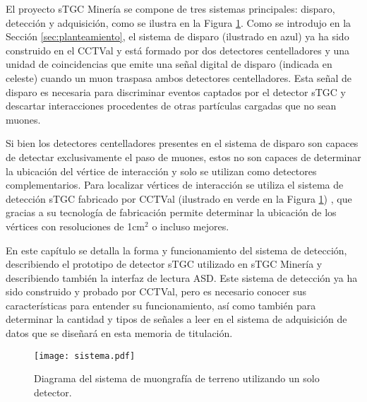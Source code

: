 El proyecto sTGC Minería se compone de tres sistemas principales: disparo, detección y adquisición, como se ilustra en la Figura \ref{fig:sistema-completo}. Como se introdujo en la Sección \ref{sec:planteamiento}, el sistema de disparo \cite{Oyanadel2020SistemaSTGC} (ilustrado en azul) ya ha sido construido en el CCTVal y está formado por dos detectores centelladores y una unidad de coincidencias que emite una señal digital de disparo (indicada en celeste) cuando un muon traspasa ambos detectores centelladores. Esta señal de disparo es necesaria para discriminar eventos captados por el detector sTGC y descartar interacciones procedentes de otras partículas cargadas que no sean muones. %
	
Si bien los detectores centelladores presentes en el sistema de disparo son capaces de detectar exclusivamente el paso de muones, estos no son capaces de determinar la ubicación del vértice de interacción y solo se utilizan como detectores complementarios. Para localizar vértices de interacción se utiliza el sistema de detección sTGC fabricado por CCTVal (ilustrado en verde en la Figura \ref{fig:sistema-completo}) , que gracias a su tecnología de fabricación permite determinar la ubicación de los vértices con resoluciones de 1cm$^2$ o incluso mejores.
	
En este capítulo se detalla la forma y funcionamiento del sistema de detección, describiendo el prototipo de detector sTGC utilizado en sTGC Minería y describiendo también la interfaz de lectura ASD. Este sistema de detección ya ha sido construido y probado por CCTVal, pero es necesario conocer sus características para entender su funcionamiento, así como también para determinar la cantidad y tipos de señales a leer en el sistema de adquisición de datos que se diseñará en esta memoria de titulación.
	


	\begin{figure}[h]
		\centering
		\texttt{[image: sistema.pdf]}
		\caption{Diagrama del sistema de muongrafía de terreno utilizando un solo detector.}
		\label{fig:sistema-completo}
	\end{figure}